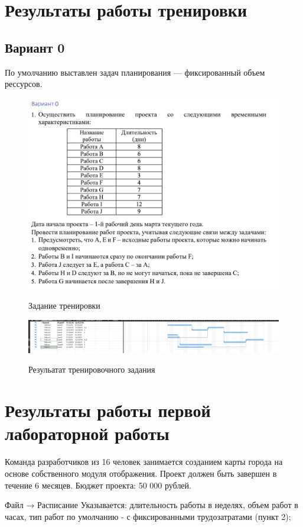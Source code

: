 \section{Результаты работы тренировки}

\subsection{Вариант 0}

По умолчанию выставлен задач планирования --- фиксированный объем рессурсов.

\begin{figure}[ht!]
	\includegraphics[width=0.75\linewidth]{assets/images/task1.png}
	\label{fig:r2}
	\caption{Задание тренировки}
\end{figure}
\FloatBarrier

\begin{figure}[ht!]
	\includegraphics[width=\linewidth]{assets/images/res.png}
	\label{fig:r2}
	\caption{Резульатат тренировочного задания}
\end{figure}
\FloatBarrier

\section{Результаты работы первой лабораторной работы}

Команда разработчиков из 16 человек занимается созданием карты города на основе собственного модуля отображения. Проект должен быть завершен в течение 6 месяцев. Бюджет проекта: 50 000 рублей.


Файл → Расписание
Указывается:
длительность работы в неделях, объем работ в часах, тип работ по умолчанию - с фиксированными трудозатратами (пункт 2);

